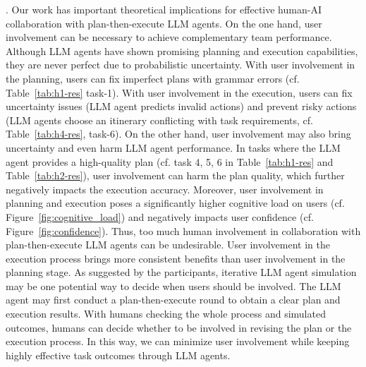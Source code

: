 . 
Our work has important theoretical implications for effective human-AI collaboration with plan-then-execute LLM agents. 
On the one hand, user involvement can be necessary to achieve complementary team performance. 
Although LLM agents have shown promising planning and execution capabilities, they are never perfect due to probabilistic uncertainty. 
With user involvement in the planning, users can fix imperfect plans with grammar errors (cf. Table~\ref{tab:h1-res} task-1). 
With user involvement in the execution, users can fix uncertainty issues (\eg LLM agent predicts invalid actions) and prevent risky actions (\eg LLM agents choose an itinerary conflicting with task requirements, cf. Table~\ref{tab:h4-res}, task-6). 
On the other hand, user involvement may also bring uncertainty and even harm LLM agent performance. 
In tasks where the LLM agent provides a high-quality plan (cf. task 4, 5, 6 in Table~\ref{tab:h1-res} and Table~\ref{tab:h2-res}), user involvement can harm the plan quality, which further negatively impacts the execution accuracy. 
Moreover, user involvement in planning and execution poses a significantly higher cognitive load on users (cf. Figure~\ref{fig:cognitive_load}) and negatively impacts user confidence (cf. Figure~\ref{fig:confidence}). 
Thus, too much human involvement in collaboration with plan-then-execute LLM agents can be undesirable. 
User involvement in the execution process brings more consistent benefits than user involvement in the planning stage. 
As suggested by the participants, iterative LLM agent simulation may be one potential way to decide when users should be involved. 
The LLM agent may first conduct a plan-then-execute round to obtain a clear plan and execution results. 
With humans checking the whole process and simulated outcomes, humans can decide whether to be involved in revising the plan or the execution process. 
In this way, we can minimize user involvement while keeping highly effective task outcomes through LLM agents.

